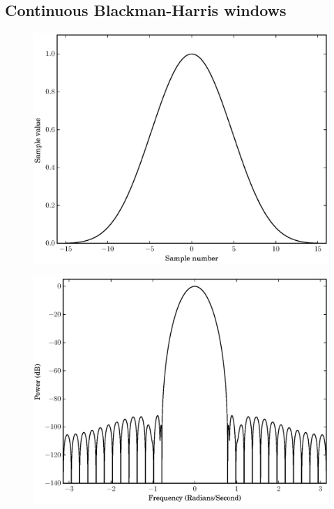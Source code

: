 \subsection{Continuous Blackman-Harris windows}

\begin{figure}[!t]
    \centering
    \includegraphics[width=\figwidthscale\textwidth]{plots/min4_blackman_td.eps}
    \CaptionWithTitle{%
    }{\label{plot:min4blackmantd}}
\end{figure}

\begin{figure}[!t]
    \centering
    \includegraphics[width=\figwidthscale\textwidth]{plots/min4_blackman_fd.eps}
    \CaptionWithTitle{%
    }{\label{plot:min4blackmanfd}}
\end{figure}

